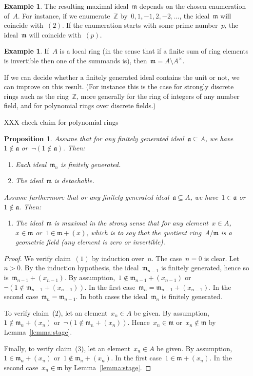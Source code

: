 \documentclass[12pt,oneside,reqno]{amsart}
\theoremstyle{definition}
\newtheorem{ex}[defn]{Example}
\theoremstyle{plain}
\newtheorem{prop}[defn]{Proposition}
\theoremstyle{remark}
\newcommand{\aaa}{\mathfrak{a}}
\newcommand{\mmm}{\mathfrak{m}}
\newcommand{\ZZ}{\mathbb{Z}}
\renewcommand{\_}{\mathpunct{.}\,}
\begin{document}
\begin{ex}The resulting maximal ideal~$\mmm$ depends on the chosen enumeration
of~$A$. For instance, if we enumerate~$\ZZ$ by~$0,1,-1,2,-2,\ldots$, the
ideal~$\mmm$ will coincide with~$(2)$. If the enumeration starts with some
prime number~$p$, the ideal~$\mmm$ will coincide with~$(p)$.\end{ex}

\begin{ex}If~$A$ is a local ring (in the sense that if a finite sum of ring
elements is invertible then one of the summands is), then~$\mmm = A \setminus
A^\times$.\end{ex}

If we can decide whether a finitely generated ideal contains the
unit or not, we can improve on this result. (For instance this is the case for
strongly discrete rings auch as the ring~$\ZZ$, more generally for the ring of integers of any number
field, and for polynomial rings over discrete fields.)

XXX check claim for polynomial rings

\begin{prop}\label{prop:with-test}
Assume that for any finitely generated ideal~$\aaa \subseteq A$, we have~$1
\not\in \aaa$ or~$\neg(1 \not\in \aaa)$. Then:
\begin{enumerate}
\item Each ideal~$\mmm_n$ is finitely generated.
\item The ideal~$\mmm$ is detachable.
\end{enumerate}
Assume furthermore that or any finitely generated ideal~$\aaa \subseteq
A$, we have~$1 \in \aaa$ or~$1 \not\in \aaa$. Then:
\begin{enumerate}
\addtocounter{enumi}{2}
\item The ideal~$\mmm$ is maximal in the strong sense that for any element~$x
\in A$,~$x \in \mmm$ or~$1 \in \mmm + (x)$, which is to say that the quotient ring~$A/\mmm$ is a
\emph{geometric field} (any element is zero or invertible).
\end{enumerate}
\end{prop}

\begin{proof}We verify claim~$(1)$ by induction over~$n$. The case~$n = 0$ is
clear. Let~$n > 0$. By the induction hypothesis, the ideal~$\mmm_{n-1}$ is finitely
generated, hence so is~$\mmm_{n-1} + (x_{n-1})$. By assumption,~$1 \not\in \mmm_{n-1} +
(x_{n-1})$ or~$\neg(1 \not\in \mmm_{n-1} + (x_{n-1}))$. In the first
case~$\mmm_n = \mmm_{n-1} + (x_{n-1})$. In the second case~$\mmm_n =
\mmm_{n-1}$. In both cases
the ideal~$\mmm_n$ is finitely generated.

To verify claim~(2), let an element~$x_n \in A$ be given. By assumption,~$1
\not\in \mmm_n + (x_n)$ or~$\neg(1 \not\in \mmm_n + (x_n))$. Hence~$x_n \in
\mmm$ or~$x_n \not\in \mmm$ by Lemma~\ref{lemma:stage}.

Finally, to verify claim~(3), let an element~$x_n \in A$ be given. By
assumption,~$1 \in \mmm_n + (x_n)$ or~$1 \not\in \mmm_n + (x_n)$. In the first
case~$1 \in \mmm + (x_n)$. In the second
case~$x_n \in \mmm$ by Lemma~\ref{lemma:stage}.
\end{proof}
\end{document}
